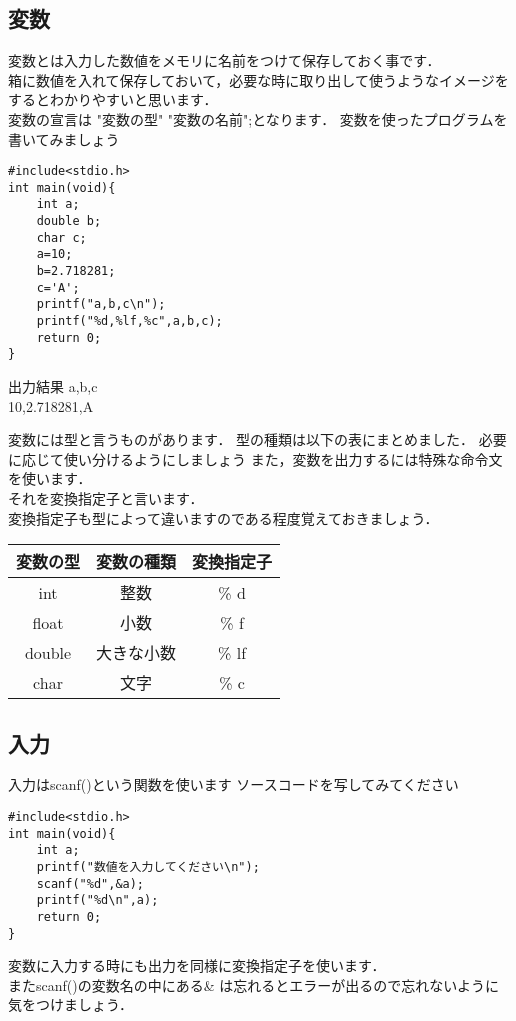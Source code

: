 \documentclass[a4j,titlepage,dvipdfmx]{jsarticle}   %
\begin{document}
\subsection{変数}
変数とは入力した数値をメモリに名前をつけて保存しておく事です．\\
箱に数値を入れて保存しておいて，必要な時に取り出して使うようなイメージをするとわかりやすいと思います．\\
変数の宣言は "変数の型" "変数の名前";となります．
変数を使ったプログラムを書いてみましょう
\begin{lstlisting}
#include<stdio.h>
int main(void){
	int a;
	double b;
	char c;
	a=10;
	b=2.718281;
	c='A';
	printf("a,b,c\n");
	printf("%d,%lf,%c",a,b,c);
	return 0;
}
\end{lstlisting}
\begin{itembox}{出力結果}
a,b,c\\
10,2.718281,A
\end{itembox}
変数には型と言うものがあります．
型の種類は以下の表にまとめました．
必要に応じて使い分けるようにしましょう
また，変数を出力するには特殊な命令文を使います．\\
それを変換指定子と言います．\\
変換指定子も型によって違いますのである程度覚えておきましょう．\\
\begin{table}[h]
\begin{tabular}{|c|c|c|}
\hline
変数の型 & 変数の種類 &変換指定子\\ \hline
int & 整数 & \% d \\ \hline
float & 小数 & \% f \\ \hline
double & 大きな小数 & \% lf\\ \hline
char & 文字  & \% c \\ \hline
\end{tabular}
\end{table}
\subsection{入力}
入力はscanf()という関数を使います
ソースコードを写してみてください
\newpage
\begin{lstlisting}
#include<stdio.h>
int main(void){
	int a;
    printf("数値を入力してください\n");
    scanf("%d",&a);
    printf("%d\n",a);
    return 0;
}
\end{lstlisting}
変数に入力する時にも出力を同様に変換指定子を使います．\\
またscanf()の変数名の中にある\& は忘れるとエラーが出るので忘れないように気をつけましょう．\\
\end{document}
